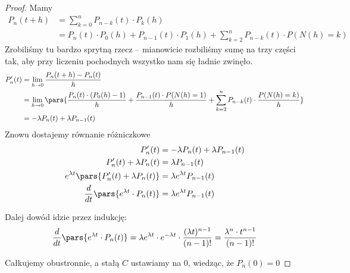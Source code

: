 \begin{proof}
    Mamy
    \begin{align*}
        P_n(t + h)
            &= \sum_{k=0}^n P_{n-k}(t) \cdot P_k(h) \\
            &= P_n(t) \cdot P_0(h) + P_{n-1}(t) \cdot P_1(h) + \sum_{k=2}^n P_{n-k}(t) \cdot P(N(h) = k) 
    \end{align*}
    Zrobiliśmy tu bardzo sprytną rzecz -- mianowicie rozbiliśmy sumę na trzy części tak, aby przy liczeniu pochodnych wszystko nam się ładnie zwinęło.
    \begin{align*}
        P_n'(t) 
            &= \lim_{h \rightarrow 0} \frac{P_n(t + h) - P_n(t)}{h} \\
            &=  \lim_{h \rightarrow 0} \pars{
                \frac{P_n(t) \cdot (P_0(h) - 1)}{h} 
                + \frac{P_{n-1}(t)\cdot P(N(h) = 1)}{h}
                + \sum_{k=2}^n P_{n-k}(t) \cdot \frac{P(N(h) = k)}{h}} \\
            &= -\lambda P_n(t) + \lambda P_{n-1}(t)
    \end{align*}
    Znowu dostajemy równanie różniczkowe
    \begin{align*}
        P_n'(t) &= -\lambda P_n(t) + \lambda P_{n-1}(t) \\
        P_n'(t) + \lambda P_n(t) &= \lambda P_{n-1}(t) \\
        e^{\lambda t}\pars{P_n'(t) + \lambda P_n(t)} &= \lambda e^{\lambda t} P_{n-1}(t) \\
        \frac{d}{dt}\pars{e^{\lambda t}\cdot P_n(t)} &= \lambda e^{\lambda t} P_{n-1}(t)
    \end{align*}
    
    Dalej dowód idzie przez indukcję:
    \[
        \frac{d}{dt}\pars{e^{\lambda t}\cdot P_n(t)} = \lambda e^{\lambda t} \cdot e^{-\lambda t} \cdot \frac{(\lambda t)^{n-1}}{(n-1)!} = \frac{\lambda^n \cdot t^{n-1}}{(n-1)!}
    \]
    
    Całkujemy obustronnie, a stałą \( C \) ustawiamy na 0, wiedząc, że \( P_n(0) = 0 \)
    
\end{proof}


